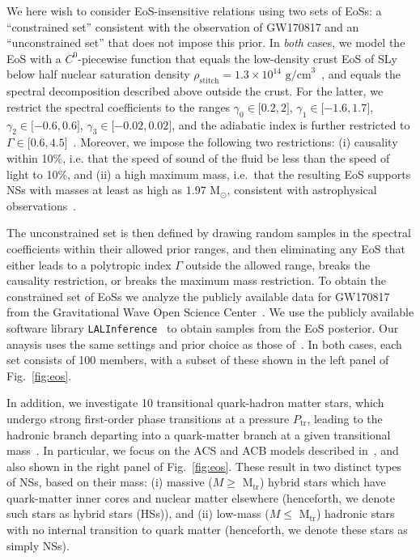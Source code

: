 \documentclass[prd,twocolumn,nofootinbib,superscriptaddress,amsmath,amssymb]{revtex4-1}
\begin{document}
We here wish to consider EoS-insensitive relations using two sets of EoSs: a ``constrained set'' consistent with the observation of GW170817 and an ``unconstrained set'' that does not impose this prior. In \emph{both} cases, we model the EoS with a $C^{0}$-piecewise function that equals the low-density crust EoS of SLy~\cite{Douchin:2001sv} below half nuclear saturation density $\rho_{\text{stitch}}=1.3 \times 10^{14} \text{ g/cm}^3$~\cite{Read2009}, and equals the spectral decomposition described above outside the crust. For the latter, we restrict the spectral coefficients to the ranges $\gamma_0 \in \lbrack 0.2,2 \rbrack$, $\gamma_1 \in \lbrack -1.6,1.7 \rbrack$, $\gamma_2 \in \lbrack -0.6,0.6 \rbrack$, $\gamma_3 \in \lbrack -0.02,0.02 \rbrack$, and the adiabatic index is further restricted to $\Gamma \in \lbrack 0.6,4.5 \rbrack$~\cite{Lindblom:parameters}. Moreover, we impose the following two restrictions:  (i) causality within 10\%, i.e. that the speed of sound of the fluid be less than the speed of light to 10\%, and (ii) a high maximum mass, i.e.~that the resulting EoS supports NSs with masses at least as high as $1.97 \text{ M}_{\odot}$, consistent with astrophysical observations~\cite{1.97NS,2.01NS,Zhao:massiveNS}. 

The unconstrained set is then defined by drawing random samples in the spectral coefficients within their allowed prior ranges, and then eliminating any EoS that either leads to a polytropic index $\Gamma$ outside the allowed range, breaks the causality restriction, or breaks the maximum mass restriction. 
To obtain the constrained set of EoSs we analyze the publicly available data for GW170817 from the Gravitational Wave Open Science Center~\cite{GWOSC,Vallisneri:2014vxa}. We use the publicly available software library {\tt LALInference}~\cite{Veitch:2014wba,lalinference_o2} to obtain samples from the EoS posterior. Our anaysis uses the same settings and prior choice as those of~\cite{LIGO:posterior,Carney:2018sdv}. 
In both cases, each set consists of 100 members, with a subset of these shown in the left panel of Fig.~\ref{fig:eos}.

In addition, we investigate 10 transitional quark-hadron matter stars, which undergo strong first-order phase transitions at a pressure $P_{\text{tr}}$, leading to the hadronic branch departing into a quark-matter branch at a given transitional mass~\cite{Paschalidis2018,Alford:2017qgh,1971SvA....15..347S,Zdunik:2012dj,Alford:2013aca}. In particular, we focus on the ACS and ACB models described in~\cite{Paschalidis2018}, and also shown in the right panel of Fig.~\ref{fig:eos}. These result in two distinct types of NSs, based on their mass: (i) massive ($M \geq \text{ M}_{\text{tr}}$) hybrid stars which have quark-matter inner cores and nuclear matter elsewhere (henceforth, we denote such stars as hybrid stars (HSs)), and (ii) low-mass ($M \leq \text{ M}_{\text{tr}}$) hadronic stars with no internal transition to quark matter (henceforth, we denote these stars as simply NSs).
\end{document}
